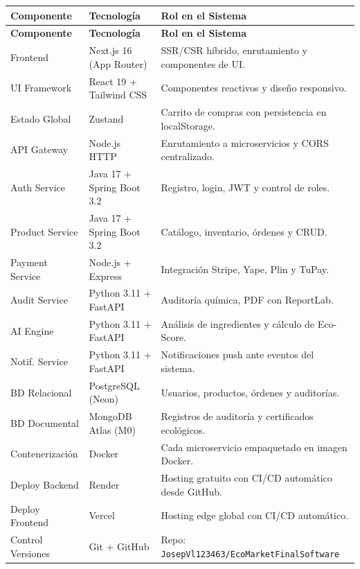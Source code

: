 \documentclass[12pt,a4paper]{article}
\begin{document}
\begin{center}
\begin{longtable}{|L{3cm}|L{4cm}|L{7cm}|}
\hline
{}
\color{white}\textbf{Componente} &
\color{white}\textbf{Tecnolog\'ia} &
\color{white}\textbf{Rol en el Sistema} \\
\hline
\endfirsthead
\hline
{}
\color{white}\textbf{Componente} &
\color{white}\textbf{Tecnolog\'ia} &
\color{white}\textbf{Rol en el Sistema} \\
\hline
\endhead

Frontend        & Next.js 16 (App Router) & SSR/CSR h\'ibrido, enrutamiento y componentes de UI. \\
\hline
UI Framework    & React 19 + Tailwind CSS & Componentes reactivos y dise\~no responsivo. \\
\hline
{}
Estado Global   & Zustand                 & Carrito de compras con persistencia en localStorage. \\
\hline
API Gateway     & Node.js HTTP            & Enrutamiento a microservicios y CORS centralizado. \\
\hline
{}
Auth Service    & Java 17 + Spring Boot 3.2 & Registro, login, JWT y control de roles. \\
\hline
Product Service & Java 17 + Spring Boot 3.2 & Cat\'alogo, inventario, \'ordenes y CRUD. \\
\hline
{}
Payment Service & Node.js + Express       & Integraci\'on Stripe, Yape, Plin y TuPay. \\
\hline
Audit Service   & Python 3.11 + FastAPI   & Auditor\'ia qu\'imica, PDF con ReportLab. \\
\hline
{}
AI Engine       & Python 3.11 + FastAPI   & An\'alisis de ingredientes y c\'alculo de Eco-Score. \\
\hline
Notif. Service  & Python 3.11 + FastAPI   & Notificaciones push ante eventos del sistema. \\
\hline
{}
BD Relacional   & PostgreSQL (Neon)       & Usuarios, productos, \'ordenes y auditor\'ias. \\
\hline
BD Documental   & MongoDB Atlas (M0)      & Registros de auditor\'ia y certificados ecol\'ogicos. \\
\hline
{}
Contenerizaci\'on & Docker                & Cada microservicio empaquetado en imagen Docker. \\
\hline
Deploy Backend  & Render                  & Hosting gratuito con CI/CD autom\'atico desde GitHub. \\
\hline
{}
Deploy Frontend & Vercel                  & Hosting edge global con CI/CD autom\'atico. \\
\hline
Control Versiones & Git + GitHub          & Repo: \texttt{JosepVl123463/EcoMarketFinalSoftware} \\
\hline
\end{longtable}
\end{center}
\end{document}

